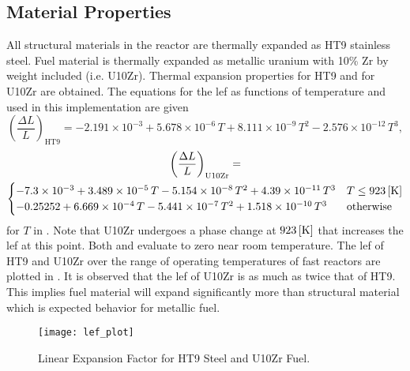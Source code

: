   \subsection{Material Properties}
    \label{sec:model_details__material_properties}
    All structural materials in the reactor are thermally expanded as HT9 
    stainless steel.
    Fuel material is thermally expanded as metallic uranium with 10\% Zr by 
    weight included (i.e. U10Zr). Thermal expansion properties for HT9 
    \cite{ht9Prop} and for U10Zr \cite{thexpU10Zr} are obtained. The 
    equations for the \gls{lef} as functions of temperature and used in this 
    implementation are given
    \begin{equation}
      \label{eq:lef_ht9}
      \left( \frac{\Delta L}{L} \right)_{\text{HT9}} = 
        -2.191 \times 10^{-3} + 5.678 \times 10^{-6} \, T + 
        8.111 \times 10^{-9} \, T^2 - 2.576 \times 10^{-12} \, T^3 ,
    \end{equation}
    \begin{multline}
      \label{eq:lef_u10zr}
      \left( \frac{\Delta L}{L} \right)_{\text{U10Zr}} = \\
        \begin{cases}
          -7.3 \times 10^{-3} + 3.489 \times 10^{-5} \, T 
            - 5.154 \times 10^{-8} \, T^2 + 4.39 \times 10^{-11} \, T^3 & 
            T \le 923 \left[\text{{K}}\right] \\
          -0.25252 + 6.669 \times 10^{-4} \, T - 5.441 \times 10^{-7} \, T^2 
            + 1.518 \times 10^{-10} \, T^3 & \text{otherwise}
        \end{cases}
    \end{multline}
    for $T$ in . Note that U10Zr undergoes a phase change at 
    $923 \left[\text{{K}}\right]$ that increases the \gls{lef} at this point. Both 
     and  evaluate to zero near room
    temperature. The \gls{lef} of HT9 and U10Zr over the range of operating 
    temperatures of fast reactors are plotted in . It is
    observed that the \gls{lef} of U10Zr is as much as twice that of HT9. This 
    implies fuel material will expand significantly more than structural 
    material which is expected behavior for metallic fuel.

    \begin{figure}
      \centering
      \texttt{[image: lef\_plot]}
      \caption{Linear Expansion Factor for HT9 Steel and U10Zr Fuel.}
      \label{fig:lef_plot}
    \end{figure}
    
